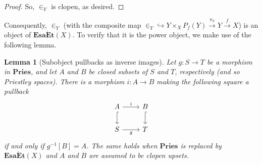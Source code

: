 \documentclass[12pt]{amsart}
\theoremstyle{plain}
\newtheorem{lemma}[theorem]{Lemma}
\theoremstyle{definition}
\newcommand{\cat}[1]{\mathbf{#1}}
\newcommand{\Pries}{\cat{Pries}}
\newcommand{\EsaEt}{\cat{Esa\acute{E}t}}
\begin{document}
\begin{proof}
    So, $\in_{Y}$ is clopen, as desired.
\end{proof}


Consequently, $\in_{Y}$ (with the composite map ${\in_Y} \hookrightarrow Y \times_X P_f(Y) \xrightarrow{\pi_Y} Y \xrightarrow{f} X$) is an object of $\EsaEt(X)$.
To verify that it is the power object, we make use of the following lemma.


\begin{lemma}[Subobject pullbacks as inverse images] \label{l:pullback-mono-Pries}
    Let $g \colon S \to T$ be a morphism in $\Pries$, and let $A$ and $B$ be closed subsets of $S$ and $T$, respectively (and so Priestley spaces).
    There is a morphism $i \colon A \to B$ making the following square a pullback
    \[
    \begin{tikzcd}[ampersand replacement = \&]
        A \arrow{r}{i} \arrow[hook]{d}\& B \arrow[hook]{d}\\
        S \arrow[swap]{r}{g} \& T
    \end{tikzcd}
    \]
    if and only if $g^{-1}[B] = A$.
    The same holds when $\Pries$ is replaced by $\EsaEt(X)$ and $A$ and $B$ are assumed to be clopen upsets.
\end{lemma}
\end{document}
